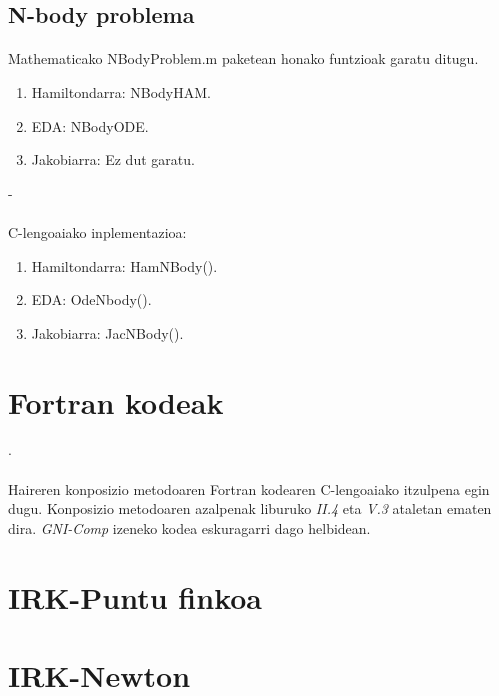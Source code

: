 \subsection*{N-body problema}

\paragraph*{} Mathematicako NBodyProblem.m paketean honako funtzioak garatu ditugu.

\begin{enumerate}
   \item Hamiltondarra: NBodyHAM.
   \item EDA: NBodyODE.
   \item Jakobiarra: Ez dut garatu.
\end{enumerate}

-\paragraph*{} C-lengoaiako inplementazioa:

\begin{enumerate}
   \item Hamiltondarra: HamNBody().
   \item EDA: OdeNbody().
   \item Jakobiarra: JacNBody().
\end{enumerate}

\section{Fortran kodeak}.

\paragraph*{} Haireren konposizio metodoaren Fortran kodearen  C-lengoaiako itzulpena egin dugu. Konposizio metodoaren azalpenak liburuko \cite{Hairer2006}  \emph{II.4} eta \emph{V.3} ataletan ematen dira. \emph{GNI-Comp} izeneko kodea eskuragarri dago \cite{HairerGniComp} helbidean.  

\section{IRK-Puntu finkoa}

\section{IRK-Newton}


